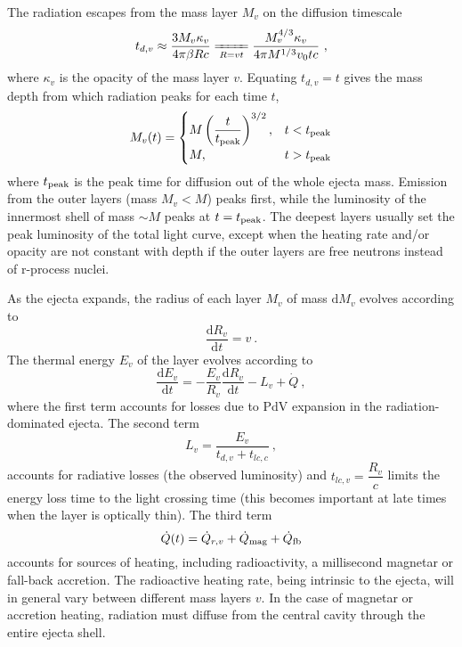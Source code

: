 \documentclass[11pt,a4paper]{article}
\newcommand{\dif}{\mathrm{d}}
\begin{document}
The radiation escapes from the mass layer $M_v$ on the diffusion timescale
\begin{equation}
t_{d, v} \approx \dfrac{3 M_v \kappa_v}{4\pi \beta R c} \xlongequal[R = vt]{} \dfrac{M_v^{4/3} \kappa_v}{4\pi M^{1/3} v_0 t c} ~,
\end{equation}
where $\kappa_v$ is the opacity of the mass layer $v$. Equating $t_{d,v} = t$ gives the mass depth from which radiation peaks for each time $t$,
\begin{equation}
M_v(t) = 
\begin{cases}
M\left(\dfrac{t}{t_{\rm peak}} \right)^{3/2}, & t < t_{\rm peak}\cr 
M, & t > t_{\rm peak} \cr 
\end{cases}
\end{equation}
where $t_{\rm peak}$ is the peak time for diffusion out of the whole ejecta mass. Emission from the outer layers (mass $M_v < M$) peaks first, while the luminosity of the innermost shell of mass $\sim M$ peaks at $t = t_{\rm peak}$. The deepest layers usually set the peak luminosity of the total light curve, except when the heating rate and/or opacity are not constant with depth if the outer layers are free neutrons instead of r-process nuclei.

As the ejecta expands, the radius of each layer $M_v$ of mass $\dif M_v$ evolves according to
\begin{equation}
\dfrac{\dif R_v}{\dif t} = v ~.
\end{equation}
The thermal energy $E_v$ of the layer evolves according to
\begin{equation}
\dfrac{\dif E_v}{\dif t} = - \dfrac{E_v}{R_v} \dfrac{\dif R_v}{\dif t} -L_v +\dot{Q} ~,
\end{equation}
where the first term accounts for losses due to PdV expansion in the radiation-dominated ejecta. The second term
\begin{equation}
L_v = \dfrac{E_v}{t_{d,v} +t_{lc, c} } ~,
\end{equation}
accounts for radiative losses (the observed luminosity) and $t_{lc,v} = \dfrac{R_v}{c}$ limits the energy loss time to the light crossing time (this becomes important at late times when the layer is optically thin). The third term
\begin{equation}
\dot{Q}(t) = \dot{Q}_{r,v} +\dot{Q}_{\rm mag} +\dot{Q}_{\rm fb}
\end{equation}
accounts for sources of heating, including radioactivity, a millisecond magnetar or fall-back accretion. The radioactive heating rate, being intrinsic to the ejecta, will in general vary between different mass layers $v$. In the case of magnetar or accretion heating, radiation must diffuse from the central cavity through the entire ejecta shell.
\end{document}
